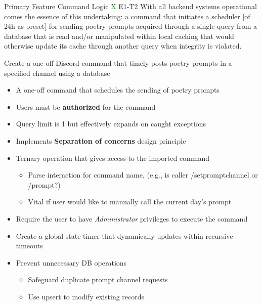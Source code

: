 \documentclass[7px]{article}
\begin{document}
\frontmatter
{Primary Feature}
{Command Logic}
{\textcolor{green}{X}}
{E1-T2}
{With all backend systems operational comes the essence of this undertaking: a command that initiates a scheduler [of 24h as preset] for sending poetry prompts acquired through a single query from a database that is read and/or manipulated within local caching that would otherwise update its cache through another query when integrity is violated.}

\strategy
{
  Create a one-off Discord command that timely posts poetry prompts in a specified channel using a database
}
{
  \begin{enumerate}
    \small
    \begin{itemize}[label=$\multimapdotinv$, leftmargin=1.7mm]
      \item A one-off command that schedules the sending of poetry prompts
      \item Users must be \textbf{authorized} for the command
      \item Query limit is 1 but effectively expands on caught exceptions
      \item Implements \textbf{Separation of concerns} design principle
    \end{itemize}
    \normalsize
\end{enumerate}
}
{
  \small
  \begin{itemize}[label=$\multimapdotinv$]
    \item Ternary operation that gives access to the imported command
      \footnotesize{
        \begin{itemize}
          \item Parse interaction for command name, (e.g., is caller /setpromptchannel or /prompt?)
          \item Vital if user would like to manually call the current day's prompt
        \end{itemize}
      }
    \item Require the user to have \textit{Administrator} privileges to execute the command
    \item Create a global state timer that dynamically updates within recursive timeouts
    \item Prevent unnecessary DB operations
      \begin{itemize}
        \item Safeguard duplicate prompt channel requests
        \item Use upsert to modify existing records 
      \end{itemize}
  \end{itemize}
  \normalsize
}
\end{document}
